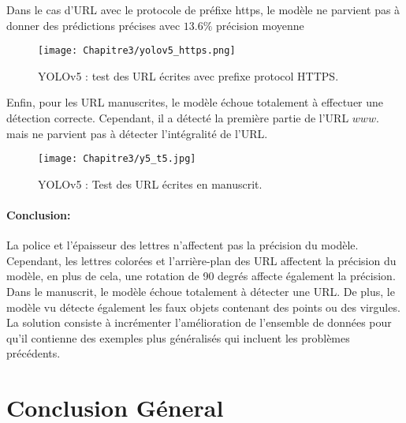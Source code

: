      Dans le cas d'URL avec le protocole de préfixe https, le modèle ne parvient pas à donner des prédictions précises avec $13.6\%$ précision moyenne
     \begin{figure}[H]
               \centering
               \texttt{[image: Chapitre3/yolov5\_https.png]}
               \caption{YOLOv5 : test des URL écrites avec prefixe protocol HTTPS.}
               \label{y5_https}
               \end{figure}
     

     Enfin, pour les URL manuscrites, le modèle échoue totalement à effectuer une détection correcte. Cependant, il a détecté la première partie de l'URL $www.$ mais ne parvient pas à détecter l'intégralité de l'URL.
     \begin{figure}[H]
               \centering
               \texttt{[image: Chapitre3/y5\_t5.jpg]}
               \caption{YOLOv5 : Test des URL écrites en manuscrit.}
               \label{y5_t5}
               \end{figure}

     \paragraph{Conclusion:} La police et l'épaisseur des lettres n'affectent pas la précision du modèle. Cependant, les lettres colorées et l'arrière-plan des URL affectent la précision du modèle, en plus de cela, une rotation de 90 degrés affecte également la précision. Dans le manuscrit, le modèle échoue totalement à détecter une URL. De plus, le modèle vu détecte également les faux objets contenant des points ou des virgules.
     La solution consiste à incrémenter l'amélioration de l'ensemble de données pour qu'il contienne des exemples plus généralisés qui incluent les problèmes précédents.

\section{Conclusion Géneral}